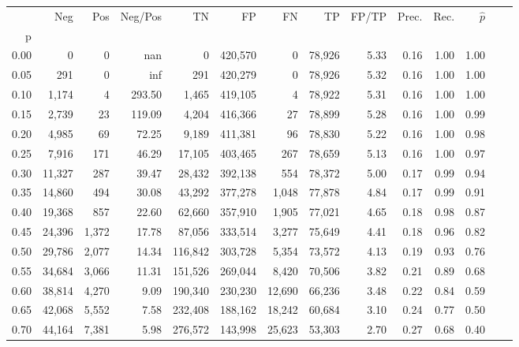 \begin{tabular}{rrrrrrrrrrrrrr}
\toprule
{} &     Neg &     Pos & Neg/Pos &       TN &       FP &      FN &      TP & FP/TP & Prec. &  Rec. & $\hat{p}$ \\
p    &         &         &         &          &          &         &         &       &       &       &           \\
\midrule
0.00 &       0 &       0 &     nan &        0 &  420,570 &       0 &  78,926 &  5.33 &  0.16 &  1.00 &      1.00 \\
0.05 &     291 &       0 &     inf &      291 &  420,279 &       0 &  78,926 &  5.32 &  0.16 &  1.00 &      1.00 \\
0.10 &   1,174 &       4 &  293.50 &    1,465 &  419,105 &       4 &  78,922 &  5.31 &  0.16 &  1.00 &      1.00 \\
0.15 &   2,739 &      23 &  119.09 &    4,204 &  416,366 &      27 &  78,899 &  5.28 &  0.16 &  1.00 &      0.99 \\
0.20 &   4,985 &      69 &   72.25 &    9,189 &  411,381 &      96 &  78,830 &  5.22 &  0.16 &  1.00 &      0.98 \\
0.25 &   7,916 &     171 &   46.29 &   17,105 &  403,465 &     267 &  78,659 &  5.13 &  0.16 &  1.00 &      0.97 \\
0.30 &  11,327 &     287 &   39.47 &   28,432 &  392,138 &     554 &  78,372 &  5.00 &  0.17 &  0.99 &      0.94 \\
0.35 &  14,860 &     494 &   30.08 &   43,292 &  377,278 &   1,048 &  77,878 &  4.84 &  0.17 &  0.99 &      0.91 \\
0.40 &  19,368 &     857 &   22.60 &   62,660 &  357,910 &   1,905 &  77,021 &  4.65 &  0.18 &  0.98 &      0.87 \\
0.45 &  24,396 &   1,372 &   17.78 &   87,056 &  333,514 &   3,277 &  75,649 &  4.41 &  0.18 &  0.96 &      0.82 \\
0.50 &  29,786 &   2,077 &   14.34 &  116,842 &  303,728 &   5,354 &  73,572 &  4.13 &  0.19 &  0.93 &      0.76 \\
0.55 &  34,684 &   3,066 &   11.31 &  151,526 &  269,044 &   8,420 &  70,506 &  3.82 &  0.21 &  0.89 &      0.68 \\
0.60 &  38,814 &   4,270 &    9.09 &  190,340 &  230,230 &  12,690 &  66,236 &  3.48 &  0.22 &  0.84 &      0.59 \\
0.65 &  42,068 &   5,552 &    7.58 &  232,408 &  188,162 &  18,242 &  60,684 &  3.10 &  0.24 &  0.77 &      0.50 \\
0.70 &  44,164 &   7,381 &    5.98 &  276,572 &  143,998 &  25,623 &  53,303 &  2.70 &  0.27 &  0.68 &      0.40 \\

\end{tabular}
